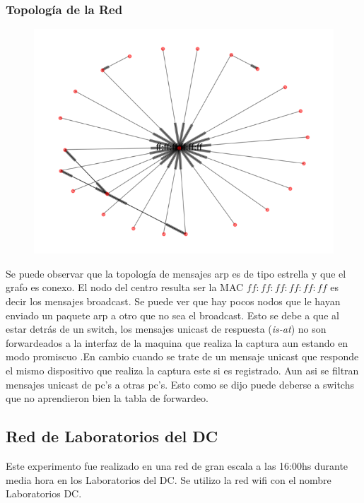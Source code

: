 \subsubsection{Topolog\'ia de la Red}
\begin{figure}[hp!]
	\begin{center}
	 \includegraphics[scale=0.6]{../plots/trabajo_s2_topologia.png}
	\end{center}
\end{figure}

Se puede observar que la topología de mensajes arp es de tipo estrella
y que el grafo es conexo. El nodo del centro resulta ser la MAC $ff:ff:ff:ff:ff:ff$
es decir los mensajes broadcast. Se puede ver que hay pocos nodos que le hayan
enviado un paquete arp a otro que no sea el broadcast. Esto se debe
a que al estar detrás de un switch, los mensajes unicast de respuesta (\textit{is-at})
no son forwardeados a la interfaz de la maquina que realiza la captura aun estando en modo promiscuo
.En cambio cuando se trate de un mensaje unicast que responde el mismo dispositivo que
realiza la captura este si es registrado. Aun asi se filtran mensajes unicast de pc's a otras pc's. Esto como
se dijo puede deberse a switchs que no aprendieron bien la tabla de forwardeo.

\subsection{Red de Laboratorios del DC}

Este experimento fue realizado en una red de gran escala a las 16:00hs durante media hora en los Laboratorios del DC.
Se utilizo la red wifi con el nombre Laboratorios DC.

